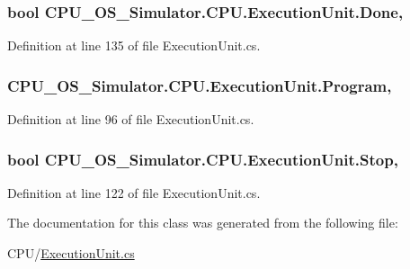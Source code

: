 \subsubsection[{Done}]{\setlength{\rightskip}{0pt plus 5cm}bool C\+P\+U\+\_\+\+O\+S\+\_\+\+Simulator.\+C\+P\+U.\+Execution\+Unit.\+Done\hspace{0.3cm}{\ttfamily [get]}, {\ttfamily [set]}}\label{class_c_p_u___o_s___simulator_1_1_c_p_u_1_1_execution_unit_afc47977290c9bccf4f3b115613a67576}


Definition at line 135 of file Execution\+Unit.\+cs.

\hypertarget{class_c_p_u___o_s___simulator_1_1_c_p_u_1_1_execution_unit_a5266ac137491de1efa6c4d707fcd162e}{}
\subsubsection[{Program}]{ C\+P\+U\+\_\+\+O\+S\+\_\+\+Simulator.\+C\+P\+U.\+Execution\+Unit.\+Program\hspace{0.3cm}{\ttfamily [get]}, {\ttfamily [set]}}\label{class_c_p_u___o_s___simulator_1_1_c_p_u_1_1_execution_unit_a5266ac137491de1efa6c4d707fcd162e}


Definition at line 96 of file Execution\+Unit.\+cs.

\hypertarget{class_c_p_u___o_s___simulator_1_1_c_p_u_1_1_execution_unit_a1b8748f1c6679263e5dc03fe382ad150}{}
\subsubsection[{Stop}]{\setlength{\rightskip}{0pt plus 5cm}bool C\+P\+U\+\_\+\+O\+S\+\_\+\+Simulator.\+C\+P\+U.\+Execution\+Unit.\+Stop\hspace{0.3cm}{\ttfamily [get]}, {\ttfamily [set]}}\label{class_c_p_u___o_s___simulator_1_1_c_p_u_1_1_execution_unit_a1b8748f1c6679263e5dc03fe382ad150}


Definition at line 122 of file Execution\+Unit.\+cs.



The documentation for this class was generated from the following file\+:\begin{DoxyCompactItemize}
\item 
C\+P\+U/\hyperlink{_execution_unit_8cs}{Execution\+Unit.\+cs}\end{DoxyCompactItemize}
